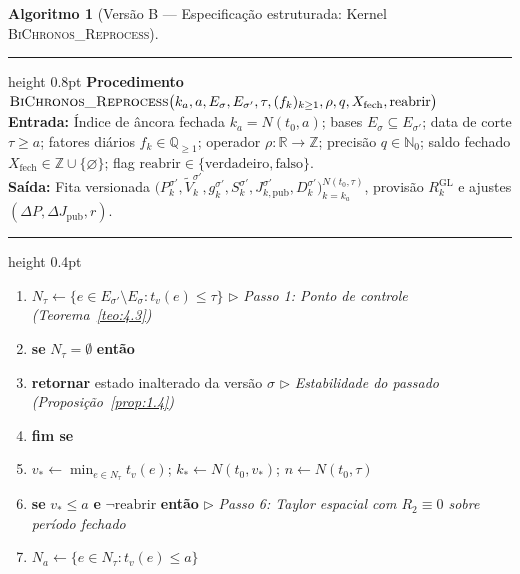 \documentclass[11pt, a4paper]{article}
\theoremstyle{definition}
\newtheorem{algoritmo}[definicao]{Algoritmo}
\theoremstyle{plain}
\theoremstyle{remark}
\begin{document}
\begin{algoritmo}[Versão B — Especificação estruturada: Kernel \textsc{BiChronos\_Reprocess}]\label{alg:5.14b}
\leavevmode\par\vspace{0.2em}
\hrule height 0.8pt
\vspace{0.3em}
\noindent\textbf{Procedimento} $\textsc{BiChronos\_Reprocess}\big(k_a, a, E_\sigma, E_{\sigma'}, \tau, (f_k)_{k\ge 1}, \rho, q, X_{\text{fech}}, \text{reabrir}\big)$\\
\textbf{Entrada:} Índice de âncora fechada $k_a = N(t_0, a)$; bases $E_\sigma \subseteq E_{\sigma'}$; data de corte $\tau \ge a$; fatores diários $f_k \in \mathbb{Q}_{\ge 1}$; operador $\rho : \mathbb{R} \to \mathbb{Z}$; precisão $q \in \mathbb{N}_0$; saldo fechado $X_{\text{fech}} \in \mathbb{Z} \cup \{\varnothing\}$; flag $\text{reabrir} \in \{\text{verdadeiro}, \text{falso}\}$.\\
\textbf{Saída:} Fita versionada $\big(P_k^{\sigma'}, \tilde{V}_k^{\sigma'}, g_k^{\sigma'}, S_k^{\sigma'}, J_{k,\text{pub}}^{\sigma'}, D_k^{\sigma'}\big)_{k=k_a}^{N(t_0, \tau)}$, provisão $R_k^{\text{GL}}$ e ajustes $(\Delta P, \Delta J_{\text{pub}}, r)$.
\vspace{0.2em}
\hrule height 0.4pt
\begin{enumerate}[label=\footnotesize\textbf{\arabic*:}, leftmargin=2.2em, itemsep=0.15em, topsep=0.3em]
    \item $N_\tau \leftarrow \{e \in E_{\sigma'} \setminus E_\sigma : t_v(e) \le \tau\}$ \hfill $\triangleright$ \emph{Passo 1: Ponto de controle (Teorema~\ref{teo:4.3})}
    \item \textbf{se} $N_\tau = \emptyset$ \textbf{então}
    \item \hspace{1.2em} \textbf{retornar} estado inalterado da versão $\sigma$ \hfill $\triangleright$ \emph{Estabilidade do passado (Proposição~\ref{prop:1.4})}
    \item \textbf{fim se}
    \item $v_* \leftarrow \min_{e \in N_\tau} t_v(e)$; \quad $k_* \leftarrow N(t_0, v_*)$; \quad $n \leftarrow N(t_0, \tau)$
    \item \textbf{se} $v_* \le a$ \textbf{e} $\neg\text{reabrir}$ \textbf{então} \hfill $\triangleright$ \emph{Passo 6: Taylor espacial com $R_2 \equiv 0$ sobre período fechado}
    \item \hspace{1.2em} $N_a \leftarrow \{e \in N_\tau : t_v(e) \le a\}$

\end{enumerate}
\end{algoritmo}
\end{document}
